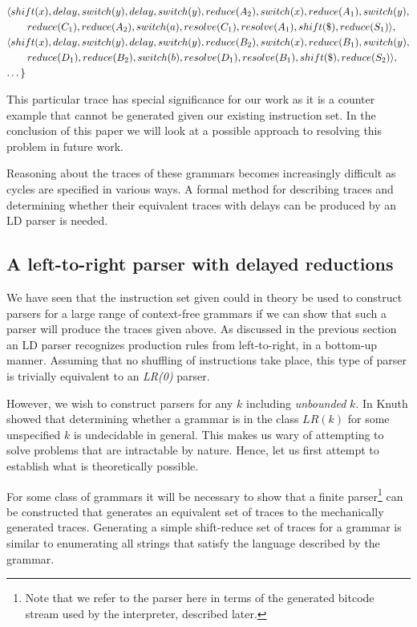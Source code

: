 \documentclass[a4paper,11pt]{article}
\begin{document}
{{\begin{align*}
   & \langle shift(x), delay, switch(y), delay, switch(y), reduce(A_2), switch(x), reduce(A_1), switch(y), \\ & \qquad reduce(C_1), reduce(A_2), switch(a), resolve(C_1), resolve(A_1), shift(\$), reduce(S_1) \rangle,\\
   & \langle shift(x), delay, switch(y), delay, switch(y), reduce(B_2), switch(x), reduce(B_1), switch(y), \\ & \qquad reduce(D_1), reduce(B_2), switch(b), resolve(D_1), resolve(B_1), shift(\$), reduce(S_2) \rangle,\\
   & \textellipsis \}
\end{align*}}}

This particular trace has special significance for our work as it is a counter example that cannot be generated given our existing instruction set.
In the conclusion of this paper we will look at a possible approach to resolving this problem in future work.

Reasoning about the traces of these grammars becomes increasingly difficult as cycles are specified in various ways.
A formal method for describing traces and determining whether their equivalent traces with delays can be produced by an LD parser is needed.

\subsection{A left-to-right parser with delayed reductions}
We have seen that the instruction set given could in theory be used to construct parsers for a large range of context-free grammars if we can show that such a parser will produce the traces given above.
As discussed in the previous section an LD parser recognizes production rules from left-to-right, in a bottom-up manner. 
Assuming that no shuffling of instructions take place, this type of parser is trivially equivalent to an \emph{LR(0)} parser.

However, we wish to construct parsers for any $k$ including \emph{unbounded} $k$. In \cite{knuth65} Knuth showed that determining whether a grammar is in the class $LR(k)$ for some unspecified $k$ is undecidable in general. 
This makes us wary of attempting to solve problems that are intractable by nature. 
Hence, let us first attempt to establish what is theoretically possible.

For some class of grammars it will be necessary to show that a finite parser\footnote{Note that we refer to the parser here in terms of the generated bitcode stream used by the interpreter, described later.} can be constructed that generates an equivalent set of traces to the mechanically generated traces.
Generating a simple shift-reduce set of traces for a grammar is similar to enumerating all strings that satisfy the language described by the grammar.
\end{document}
